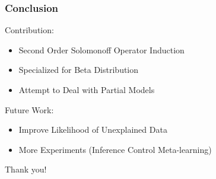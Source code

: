 \documentclass{beamer}
\begin{document}
\begin{frame}
  \frametitle{Conclusion}

  Contribution:
  \begin{itemize}
  \item Second Order Solomonoff Operator Induction
  \item Specialized for Beta Distribution
  \item Attempt to Deal with Partial Models
  \end{itemize}

  \pause
  
  Future Work:
  \begin{itemize}
  \item Improve Likelihood of Unexplained Data
  \item More Experiments (Inference Control Meta-learning)
  \end{itemize}

  \pause

  \begin{center}
    Thank you!
  \end{center}

\end{frame}
\end{document}
